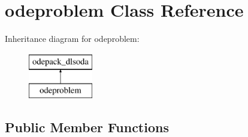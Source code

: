 \hypertarget{classodeproblem}{}\section{odeproblem Class Reference}
\label{classodeproblem}
Inheritance diagram for odeproblem\+:\begin{figure}[H]
\begin{center}
\leavevmode
\includegraphics[height=2.000000cm]{classodeproblem}
\end{center}
\end{figure}
\subsection*{Public Member Functions}
